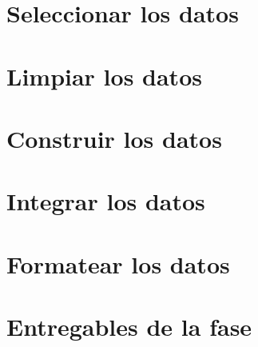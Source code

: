 \documentclass[11pt,letterpaper,DIV=12]{scrartcl}
\begin{document}


\tableofcontents
\clearpage




\section{Seleccionar los datos}



\section{Limpiar los datos}



\section{Construir los datos}




\section{Integrar los datos}



\section{Formatear los datos}



\section{Entregables de la fase}





\printbibliography
\end{document}

